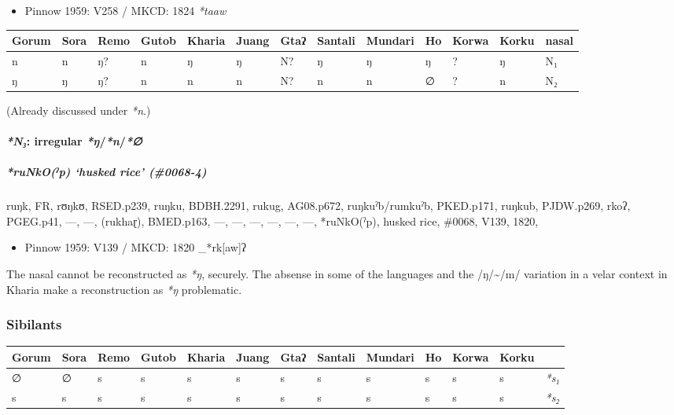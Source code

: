 \documentclass[a4paper,]{article}
\providecommand{\tightlist}{%
  \setlength{\itemsep}{0pt}\setlength{\parskip}{0pt}}
\let\oldparagraph\paragraph
\renewcommand{\paragraph}[1]{\oldparagraph{#1}\mbox{}}
\let\oldsubparagraph\subparagraph
\renewcommand{\subparagraph}[1]{\oldsubparagraph{#1}\mbox{}}
\begin{document}
\begin{itemize}
\tightlist
\item
  Pinnow 1959: V258 / MKCD: 1824 \emph{*taaw}
\end{itemize}

\begin{longtable}[]{@{}lllllllllllll@{}}
\toprule
Gorum & Sora & Remo & Gutob & Kharia & Juang & Gtaʔ & Santali & Mundari
& Ho & Korwa & Korku & nasal\tabularnewline
\midrule
\endhead
n & n & ŋ? & n & ŋ & ŋ & N? & ŋ & ŋ & ŋ & ? & ŋ & N₁\tabularnewline
ŋ & ŋ & ŋ? & n & n & n & N? & n & n & ∅ & ? & n & N₂\tabularnewline
\bottomrule
\end{longtable}

(Already discussed under \emph{*n}.)

\paragraph{\texorpdfstring{\emph{*N₃}: irregular
\emph{*ŋ}/\emph{*n}/\emph{*∅}}{*N₃: irregular *ŋ/*n/*∅}}\label{n-irregular-ux14bn}

\subparagraph{\texorpdfstring{\emph{*ruNkO(ˀp)} `husked rice'
(\#0068-4)}{*ruNkO(ˀp) husked rice (\#0068-4)}}\label{runkoux2c0p-husked-rice-0068-4-1}

ruŋk, FR, rʊŋkʊ, RSED.p239, ruŋku, BDBH.2291, rukug, AG08.p672,
ruŋkuˀb/rumkuˀb, PKED.p171, ruŋkub, PJDW.p269, rkoʔ, PGEG.p41, ---, ---,
(rukhaɽ), BMED.p163, ---, ---, ---, ---, ---, ---, *ruNkO(ˀp), husked
rice, \#0068, V139, 1820,

\begin{itemize}
\tightlist
\item
  Pinnow 1959: V139 / MKCD: 1820 \_*rk{[}aw{]}ʔ
\end{itemize}

The nasal cannot be reconstructed as \emph{*ŋ}, securely. The absense in
some of the languages and the /ŋ/\textasciitilde{}/m/ variation in a
velar context in Kharia make a reconstruction as \emph{*ŋ} problematic.

\subsubsection{Sibilants}\label{sibilants}

\begin{longtable}[]{@{}lllllllllllll@{}}
\toprule
Gorum & Sora & Remo & Gutob & Kharia & Juang & Gtaʔ & Santali & Mundari
& Ho & Korwa & Korku &\tabularnewline
\midrule
\endhead
∅ & ∅ & s & s & s & s & s & s & s & s & s & s &
\emph{*s₁}\tabularnewline
s & s & s & s & s & s & s & s & s & s & s & s &
\emph{*s₂}\tabularnewline
\bottomrule
\end{longtable}
\end{document}
